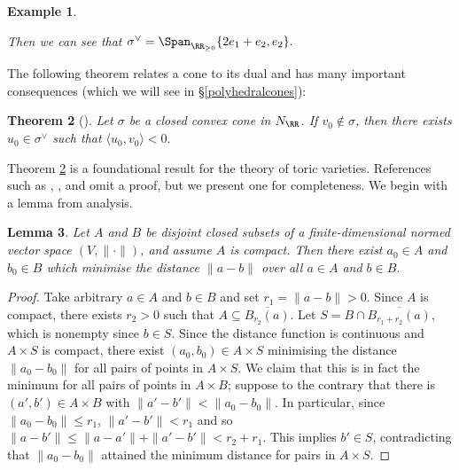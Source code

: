 \documentclass[12pt]{amsart}
\theoremstyle{plain}
\newtheorem{theorem}{Theorem}%
\newtheorem{lemma}[theorem]{Lemma}
\newtheorem{example}[theorem]{Example}
\begin{document}
\begin{example}
\begin{enumerate}
\begin{figure}[H]
\end{figure}
\noindent
Then we can see that $\sigma^\vee = \Span_{\RR_{\ge 0}} \{2 e_1 + e_2, e_2\}.$
\end{enumerate}
\end{example}

The following theorem relates a cone to its dual and has many important consequences (which we will see in \S \ref{polyhedralcones}): 

\begin{theorem}[{\cite[\S 1.2]{Fulton93}}]\label{dualitythm}
Let $\sigma$ be a closed convex cone in $N_\RR$.
If $v_0 \notin \sigma$, then there exists $u_0 \in \sigma^\vee$ such that $\langle u_0, v_0 \rangle <0.$
\end{theorem}

Theorem \ref{dualitythm} is a foundational result for the theory of toric varieties.
References such as \cite{Fulton93}, \cite{CLS11}, and \cite{Oda88} omit a proof, but we present one for completeness.
We begin with a lemma from analysis.

\begin{lemma}\label{mindistancelemma}
Let $A$ and $B$ be disjoint closed subsets of a finite-dimensional normed vector space $(V, \|\cdot\|)$, and assume $A$ is compact.
Then there exist $a_0 \in A$ and $b_0 \in B$ which minimise the distance $\|a-b\|$ over all $a \in A$ and $b \in B$.
\end{lemma}
\begin{proof}
Take arbitrary $a \in A$ and $b \in B$ and set $r_1 = \|a-b\| > 0$.
Since $A$ is compact, there exists $r_2 > 0$ such that $A \subseteq \overline{B_{r_2}(a)}$.
Let
$S = B \cap \overline{B_{r_1+r_2}(a)},$
which is nonempty since $b \in S$.
Since the distance function is continuous and $A \times S$ is compact, there exist $(a_0, b_0) \in A \times S$ minimising the distance $\|a_0 - b_0\|$ for all pairs of points in $A \times S$.
We claim that this is in fact the minimum for all pairs of points in $A \times B$; 
suppose to the contrary that there is $(a', b') \in A \times B$ with $\|a' - b'\| < \|a_0 - b_0\|$. 
In particular, since $\|a_0 - b_0\|\le r_1$, $\|a' - b'\| < r_1$ and so
$\|a - b'\| \le \|a - a'\| + \|a' - b'\| < r_2 + r_1.$
This implies $b' \in S$, contradicting that $\|a_0-b_0\|$ attained the minimum distance for pairs in $A \times S$.
\end{proof}
\end{document}
